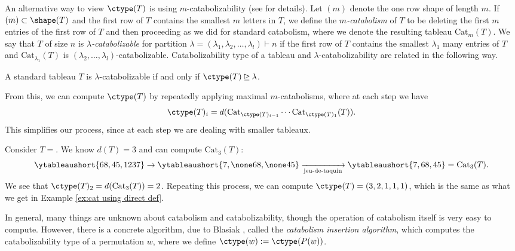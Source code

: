 An alternative way to view $\ctype(T)$ is using $m$-catabolizability (see  \cite{SW} for details).
Let $(m)$ denote the one row shape of length $m$. If $(m) \subset \shape (T)$ and the first row of $T$ contains the smallest $m$ letters in $T$, we define the \textit{$m$-catabolism} of $T$ to be deleting the first $m$ entries of the first row of $T$  and then proceeding as we did for standard catabolism, where we denote the resulting tableau $\text{Cat}_m(T)$. We say that $T$ of size $n$ is \textit{$\lambda$-catabolizable} for partition $\lambda = (\lambda_1, \lambda_2,\dots, \lambda_l)\vdash n$ if the first row of $T$ contains the smallest $\lambda_1$ many entries of $T$ and $\text{Cat}_{\lambda_1} (T)$ is $(\lambda_2,\dots, \lambda_l)$-catabolizable. 
Catabolizability type of a tableau and $\lambda$-catabolizability are related in the following way.

\begin{prop}
    A standard tableau $T$ is $\lambda$-catabolizable if and only if $\ctype(T) \unrhd \lambda$.
\end{prop}

From this, we can compute $\ctype(T)$ by repeatedly applying maximal $m$-catabolisms,  where at each step we have \[\ctype(T)_i = d(\text{Cat}_{\ctype(T)_{i-1}}\cdots \text{Cat}_{\ctype(T)_{1}}(T)).\] This simplifies our process, since at each step we are dealing with smaller tableaux.

\begin{ex}
    Consider 
$T = $.
We know $d(T) = 3$ and can compute $\text{Cat}_3(T)$:
\begin{align*}
     \ytableaushort{68,45,1237} \to  \ytableaushort{7,\none  68, \none 45} \xrightarrow[\text{jeu-de-taquin}]{}  \ytableaushort{7,68,45} = \text{Cat}_3(T).
\end{align*}
We see that $\ctype(T)_2 = d(\text{Cat}_3(T)) = 2$. 
Repeating this process, we can compute $\ctype(T) = (3,2,1,1,1)$, which is the same as what we get in Example \ref{ex:cat using direct def}. 
\end{ex}

In general, many things are unknown about catabolism and catabolizability, though the operation of catabolism itself is very easy to compute.
However, there is a concrete algorithm, due to Blasiak \cite{Blasiak}, called the \textit{catabolism insertion algorithm}, which computes the catabolizability type of a permutation $w$, where we define $\ctype(w) : = \ctype(P(w))$.

